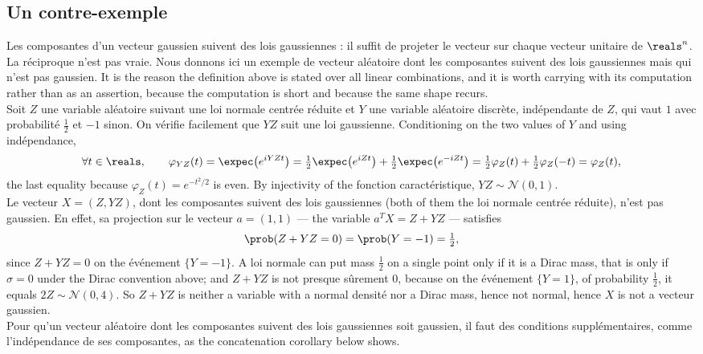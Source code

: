 \subsection{Un contre-exemple}

Les composantes d'un vecteur gaussien suivent des lois gaussiennes : il suffit de
projeter le vecteur sur chaque vecteur unitaire de $\reals^{n}$. La réciproque
n'est pas vraie. Nous donnons ici un exemple de vecteur aléatoire dont les
composantes suivent des lois gaussiennes mais qui n'est pas gaussien. It is the
reason the definition above is stated over all linear combinations, and it is
worth carrying with its computation rather than as an assertion, because the
computation is short and because the same shape recurs.\\

Soit $Z$ une variable aléatoire suivant une loi normale centrée réduite et $Y$
une variable aléatoire discrète, indépendante de $Z$, qui vaut $1$ avec
probabilité $\tfrac{1}{2}$ et $-1$ sinon. On vérifie facilement que $YZ$ suit une
loi gaussienne. Conditioning on the two values of $Y$ and using indépendance,
\[
  \forall t \in \reals, \qquad
  \varphi_{YZ}(t) = \expec\!\left(e^{iYZt}\right)
                  = \tfrac{1}{2}\expec\!\left(e^{iZt}\right)
                    + \tfrac{1}{2}\expec\!\left(e^{-iZt}\right)
                  = \tfrac{1}{2}\varphi_{Z}(t) + \tfrac{1}{2}\varphi_{Z}(-t)
                  = \varphi_{Z}(t) ,
\]
the last equality because $\varphi_{Z}(t) = e^{-t^{2}/2}$ is even. By injectivity
of the fonction caractéristique, $YZ \sim \mathcal{N}(0,1)$.\\

Le vecteur $X = (Z, YZ)$, dont les composantes suivent des lois gaussiennes (both
of them the loi normale centrée réduite), n'est pas gaussien. En effet, sa
projection sur le vecteur $a = (1,1)$ --- the variable $a^{T}X = Z + YZ$ ---
satisfies
\[
  \prob(Z + YZ = 0) = \prob(Y = -1) = \tfrac{1}{2} ,
\]
since $Z + YZ = 0$ on the événement $\{Y = -1\}$. A loi normale can put mass
$\tfrac{1}{2}$ on a single point only if it is a Dirac mass, that is only if
$\sigma = 0$ under the Dirac convention above; and $Z + YZ$ is not presque
sûrement $0$, because on the événement $\{Y = 1\}$, of probability $\tfrac{1}{2}$,
it equals $2Z \sim \mathcal{N}(0,4)$. So $Z + YZ$ is neither a variable with a
normal densité nor a Dirac mass, hence not normal, hence $X$ is not a vecteur
gaussien.\\

Pour qu'un vecteur aléatoire dont les composantes suivent des lois gaussiennes
soit gaussien, il faut des conditions supplémentaires, comme l'indépendance de
ses composantes, as the concatenation corollary below shows.

